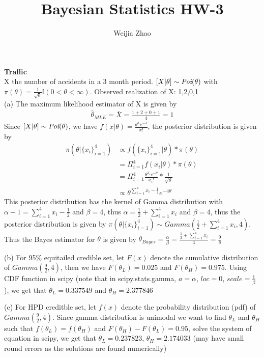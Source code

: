 \documentclass{homeworg}
\title{Bayesian Statistics HW-3}
\author{Weijia Zhao}
\begin{document}
\maketitle

\exercise 
\textbf{Traffic} \\
X the number of accidents in a 3 month period. $[X|\theta]\sim \emph{Poi}(\theta)$ with $\pi(\theta)=\frac{1}{\sqrt{\theta}}\mathbb{I}(0<\theta<\infty)$. Observed realization of X: 1,2,0,1\\
(a) The maximum likelihood estimator of X is given by 
\begin{align*}
\hat{\theta}_{MLE}=\bar{X}=\frac{1+2+0+1}{4}=1
\end{align*}
Since $[X|\theta]\sim \emph{Poi}(\theta)$, we have $f(x|\theta)=\frac{\theta^xe^{-\lambda}}{x!}$, the posterior distribution is given by
\begin{align*}
\pi(\theta|\{x_i\}_{i=1}^4)&\propto f(\{x_i\}_{i=1}^4|\theta)*\pi(\theta)\\
&=\Pi_{i=1}^4f(x_i|\theta)*\pi(\theta)\\
&=\Pi_{i=1}^4 \frac{\theta^{x_i}e^{-\theta}}{x_i!} * \frac{1}{\sqrt{\theta}}\\
&\propto \theta^{\sum_{i=1}^{4}x_i-\frac{1}{2}}e^{-4\theta}
\end{align*}
This posterior distribution has the kernel of Gamma distribution with $\alpha-1=\sum_{i=1}^{4}x_i-\frac{1}{2}$ and $\beta=4$, thus $\alpha=\frac{1}{2}+\sum_{i=1}^{4}x_i$ and $\beta=4$, thus the posterior distribution is given by $\pi(\theta|\{x_i\}_{i=1}^4)\sim Gamma(\frac{1}{2}+\sum_{i=1}^{4}x_i,4)$. Thus the Bayes estimator for $\theta$ is given by $\theta_{Bayes}=\frac{\alpha}{\beta}=\frac{\frac{1}{2}+\sum_{i=1}^{4}x_i}{4}=\frac{9}{8}$

(b) For 95\% equitailed credible set, let $F(x)$ denote the cumulative distribution of $Gamma(\frac{9}{2},4)$, then we have $F(\theta_{L})=0.025$ and $F(\theta_{H})=0.975$. Using CDF function in scipy (note that in scipy.stats.gamma, $a=\alpha$, $loc=0$, $scale=\frac{1}{\beta}$), we get that $\theta_{L}=0.337549$ and $\theta_{H}=2.377846$ 

(c) For HPD creditble set, let $f(x)$ denote the probability distribution (pdf) of $Gamma(\frac{9}{2},4)$. Since gamma distribution is unimodal we want to find $\theta_{L}$ and $\theta_{H}$ such that $f(\theta_{L})=f(\theta_{H})$ and $F(\theta_{H})-F(\theta_{L})=0.95$, solve the system of equation in scipy, we get that $\theta_{L}=0.237823$, $\theta_{H}=2.174033$ (may have small round errors as the solutions are found numerically)
\end{document}
